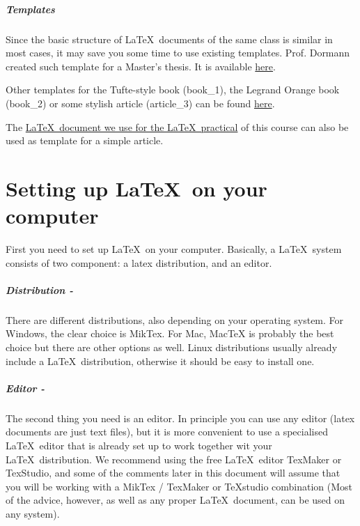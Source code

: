 \documentclass[]{tufte-book} %
\begin{document}
\paragraph{Templates}
Since the basic structure of \LaTeX\ documents of the same class is similar in most cases, it may save you some time to use existing templates. Prof. Dormann created such template for a Master's thesis. It is available \href{https://github.com/florianhartig/ResearchSkills/tree/master/Labs/LaTeX/LaTeX_Templates/Template-BScMSc-Freiburg}{here}.
 
Other templates for the Tufte-style book (book\_1), the Legrand Orange book (book\_2) or some stylish article (article\_3) can be found \href{https://github.com/florianhartig/ResearchSkills/tree/master/Labs/LaTeX/LaTeX_Templates/LatexTemplates}{here}.
 
The \href{https://github.com/florianhartig/ResearchSkills/tree/master/Labs/LaTeX/Practical}{\LaTeX\ document we use for the \LaTeX\ practical} of this course can also be used as template for a simple article. 

\chapter{Setting up \LaTeX\ on your computer}

First you need to set up \LaTeX\ on your computer. Basically, a \LaTeX\ system consists of two component: a latex distribution, and an editor.

\paragraph{Distribution -}There are different distributions, also depending on your operating system. For Windows, the clear choice is MikTex. For Mac, MacTeX is probably the best choice but there are other options as well. Linux distributions usually already include a \LaTeX\ distribution, otherwise it should be easy to install one. 

\paragraph{Editor -}The second thing you need is an editor. In principle you can use any editor (latex documents are just text files), but it is more convenient to use a specialised \LaTeX\  editor that is already set up to work together wit your \LaTeX\ distribution.  We recommend using the free \LaTeX\ editor TexMaker or TexStudio, and some of the comments later in this document will assume that you will be working with a MikTex / TexMaker or TeXstudio combination (Most of the advice, however, as well as any proper \LaTeX\ document, can be used on any system).
\end{document}

